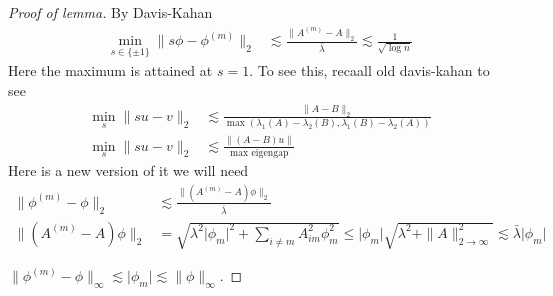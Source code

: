 \begin{proof}[Proof of lemma]
  By Davis-Kahan
  \begin{align}
    \min_{s \in \{\pm 1\}} \|s\phi - \phi^{(m)}\|_2
    &\lesssim \frac{\|A^{(m)} - A\|_2}{\bar\lambda}
    \lesssim \frac{1}{\sqrt{\log n}}
  \end{align}
  Here the maximum is attained at $s=1$. To see this, recaall old davis-kahan
  to see
  \begin{align}
    \min_s \|s u - v\|_2 &\lesssim \frac{\|A - B\|_2}{\max(\lambda_1(A) - \lambda_2(B), \lambda_1(B) - \lambda_2(A))} \\
    \min_s \|s u - v\|_2 &\lesssim \frac{\|(A-B)u\|}{\text{max eigengap}}
  \end{align}
  Here is a new version of it we will need
  \begin{align}
    \|\phi^{(m)} - \phi\|_2
    &\lesssim \frac{\|(A^{(m)} - A)\phi\|_2}{\bar\lambda} \\
    \|(A^{(m)} - A)\phi\|_2
    &= \sqrt{\lambda^2 \lvert \phi_m\rvert^2  + \sum_{i \neq m} A_{im}^2 \phi_m^2}
    \leq \lvert \phi_m\rvert \sqrt{\lambda^2 + \|A\|_{2 \to \infty}^2}
    \lesssim \bar\lambda \lvert \phi_m \rvert
  \end{align}


  $\|\phi^{(m)} - \phi\|_\infty \lesssim \lvert \phi_m \rvert \lesssim \|\phi\|_\infty$.

\end{proof}
